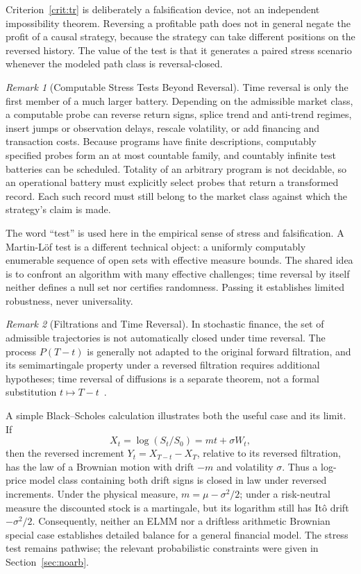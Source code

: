 \documentclass[aps,pra,reprint,superscriptaddress,amsmath,amssymb,floatfix]{revtex4-2}
\theoremstyle{plain}
\theoremstyle{definition}
\theoremstyle{remark}
\newtheorem{remark}{Remark}
\begin{document}
Criterion~\ref{crit:tr} is deliberately a falsification device, not an
independent impossibility theorem. Reversing a profitable path does not in
general negate the profit of a causal strategy, because the strategy can take
different positions on the reversed history. The value of the test is that it
generates a paired stress scenario whenever the modeled path class is
reversal-closed.

\begin{remark}[Computable Stress Tests Beyond Reversal]
\label{rem:stressfamily}
Time reversal is only the first member of a much larger battery. Depending on
the admissible market class, a computable probe can reverse return signs,
splice trend and anti-trend regimes, insert jumps or observation delays,
rescale volatility, or add financing and transaction costs. Because programs
have finite descriptions, computably specified probes form an at most
countable family, and countably infinite test batteries can be scheduled.
Totality of an arbitrary program is not decidable, so an operational battery
must explicitly select probes that return a transformed record. Each such
record must still belong to the market class against which the strategy's
claim is made.

The word ``test'' is used here in the empirical sense of stress and
falsification. A Martin-L\"of test is a different technical object: a uniformly
computably enumerable sequence of open sets with effective measure bounds.
The shared idea is to confront an algorithm with many effective challenges;
time reversal by itself neither defines a null set nor certifies randomness.
Passing it establishes limited robustness, never universality.
\end{remark}

\begin{remark}[Filtrations and Time Reversal]
In stochastic finance, the set of admissible trajectories is not automatically
closed under time reversal. The process \(P(T-t)\) is generally not adapted to
the original forward filtration, and its semimartingale property under a
reversed filtration requires additional hypotheses; time reversal of
diffusions is a separate theorem, not a formal substitution
\(t\mapsto T-t\)~\cite{HaussmannPardoux1986}.

A simple Black--Scholes calculation illustrates both the useful case and its
limit. If
\[
  X_t=\log(S_t/S_0)=mt+\sigma W_t,
\]
then the reversed increment \(Y_t=X_{T-t}-X_T\), relative to its reversed
filtration, has the law of a Brownian motion with drift \(-m\) and volatility
\(\sigma\). Thus a log-price model class containing both drift signs is closed
in law under reversed increments. Under the physical measure,
\(m=\mu-\sigma^2/2\); under a risk-neutral measure the discounted stock is a
martingale, but its logarithm still has It\^o drift \(-\sigma^2/2\).
Consequently, neither an ELMM nor a driftless arithmetic Brownian special case
establishes detailed balance for a general financial model. The stress test
remains pathwise; the relevant probabilistic constraints were given in
Section~\ref{sec:noarb}.
\end{remark}
\end{document}
